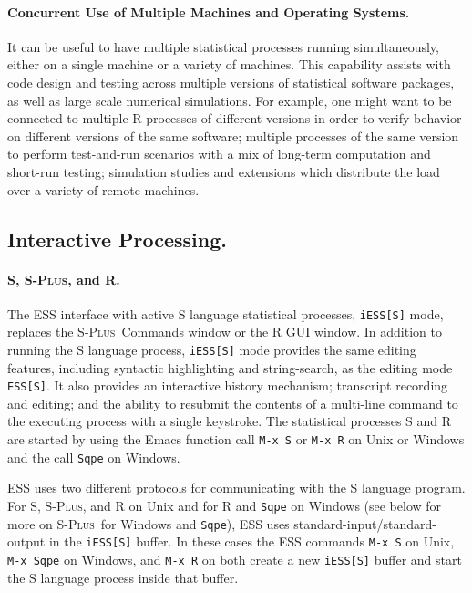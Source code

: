 \documentclass{article}
\newcommand*{\Splus}{\textsc{S-Plus}}
\newcommand{\stexttt}[1]{{\small\texttt{#1}}}
\begin{document}
\paragraph{Concurrent Use of Multiple Machines and Operating Systems.}
\label{sec:conc-use-mult}

It can be useful to have multiple statistical processes running
simultaneously, either on a single machine or a variety of machines.
This capability assists with code design and testing across multiple
versions of statistical software packages, as well as large scale
numerical simulations.  For example, one might want to be connected to
multiple R processes of different versions in order to verify behavior
on different versions of the same software; multiple processes of the
same version to perform test-and-run scenarios with a mix of long-term
computation and short-run testing; simulation studies and extensions
which distribute the load over a variety of remote machines.

\subsection{Interactive Processing.}
\label{sec:interactive}

\paragraph{S, \Splus, and R.}
\label{sec:S:inf}

The ESS interface with active S language statistical processes,
\stexttt{iESS[S]} mode, replaces the \Splus\ Commands window or the R
GUI window.
In addition to running the S language process, \stexttt{iESS[S]} mode
provides the same editing features, including syntactic highlighting
and string-search, as the editing mode \stexttt{ESS[S]}.  It also
provides an interactive history mechanism; transcript recording and
editing; and the ability to resubmit the contents of a multi-line
command to the executing process with a single keystroke.  The
statistical processes S and R are started by using the Emacs function
call \stexttt{M-x~S} or \stexttt{M-x~R} on Unix or Windows and the
call \stexttt{Sqpe} on Windows.

ESS uses two different protocols for communicating with the S language
program.  For S, \Splus, and R on Unix and for R and \stexttt{Sqpe} on Windows
(see below for more on \Splus\ for Windows and \stexttt{Sqpe}), ESS uses
standard-input/standard-output in the \stexttt{iESS[S]} buffer.  In
these cases the ESS commands \stexttt{M-x~S} on Unix,
\stexttt{M-x~Sqpe} on Windows, and \stexttt{M-x~R} on both create a
new \stexttt{iESS[S]} buffer and start the S language process inside
that buffer.
\end{document}
